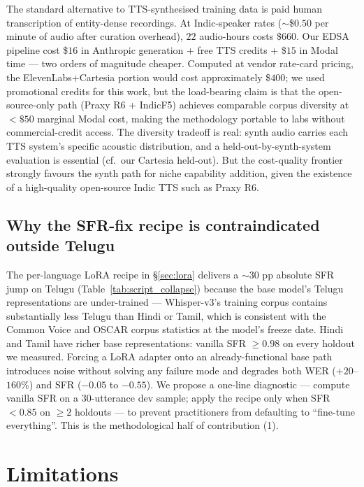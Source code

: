\documentclass[conference,a4paper]{IEEEtran}
\begin{document}
The standard alternative to TTS-synthesised training data is paid human transcription of entity-dense recordings. At Indic-speaker rates ($\sim$\$$0.50$ per minute of audio after curation overhead), $22$ audio-hours costs $\$660$. Our EDSA pipeline cost \$$16$ in Anthropic generation + free TTS credits + \$$15$ in Modal time --- two orders of magnitude cheaper. Computed at vendor rate-card pricing, the ElevenLabs+Cartesia portion would cost approximately \$$400$; we used promotional credits for this work, but the load-bearing claim is that the open-source-only path (Praxy R6 + IndicF5) achieves comparable corpus diversity at $<\$50$ marginal Modal cost, making the methodology portable to labs without commercial-credit access. The diversity tradeoff is real: synth audio carries each TTS system's specific acoustic distribution, and a held-out-by-synth-system evaluation is essential (cf.~our Cartesia held-out). But the cost-quality frontier strongly favours the synth path for niche capability addition, given the existence of a high-quality open-source Indic TTS such as Praxy R6.

\subsection{Why the SFR-fix recipe is contraindicated outside Telugu}

The per-language LoRA recipe in §\ref{sec:lora} delivers a $\sim 30$ pp absolute SFR jump on Telugu (Table~\ref{tab:script_collapse}) because the base model's Telugu representations are under-trained --- Whisper-v3's training corpus contains substantially less Telugu than Hindi or Tamil, which is consistent with the Common Voice and OSCAR corpus statistics at the model's freeze date. Hindi and Tamil have richer base representations: vanilla SFR $\geq 0.98$ on every holdout we measured. Forcing a LoRA adapter onto an already-functional base path introduces noise without solving any failure mode and degrades both WER ($+20$--$160\%$) and SFR ($-0.05$ to $-0.55$). We propose a one-line diagnostic --- compute vanilla SFR on a 30-utterance dev sample; apply the recipe only when SFR $< 0.85$ on $\geq 2$ holdouts --- to prevent practitioners from defaulting to ``fine-tune everything''. This is the methodological half of contribution (1).

\section{Limitations}\label{sec:limitations}
\end{document}
